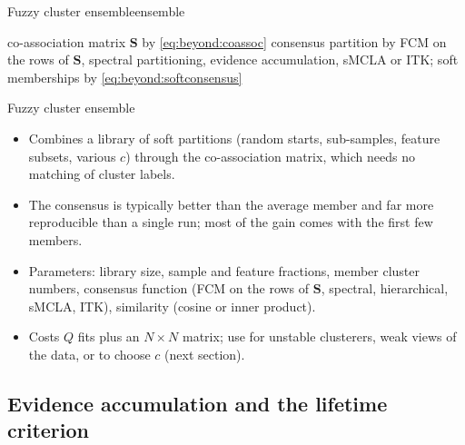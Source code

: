 \begin{algobox}{Fuzzy cluster ensemble}{ensemble}
\begin{algorithm}[H]
co-association matrix $\mathbf{S}$ by \eqref{eq:beyond:coassoc}\;
consensus partition by FCM on the rows of $\mathbf{S}$, spectral partitioning, evidence accumulation, sMCLA or ITK; soft memberships by \eqref{eq:beyond:softconsensus}\;
\end{algorithm}
\end{algobox}
\begin{summarybox}{Fuzzy cluster ensemble}
\begin{itemize}
  \item Combines a library of soft partitions (random starts, sub-samples, feature subsets, various $c$) through the co-association matrix, which needs no matching of cluster labels.
  \item The consensus is typically better than the average member and far more reproducible than a single run; most of the gain comes with the first few members.
  \item Parameters: library size, sample and feature fractions, member cluster numbers, consensus function (FCM on the rows of $\mathbf{S}$, spectral, hierarchical, sMCLA, ITK), similarity (cosine or inner product).
  \item Costs $Q$ fits plus an $N\times N$ matrix; use for unstable clusterers, weak views of the data, or to choose $c$ (next section).
\end{itemize}
\end{summarybox}

\subsection{Evidence accumulation and the lifetime criterion}\label{sec:beyond:eac}

